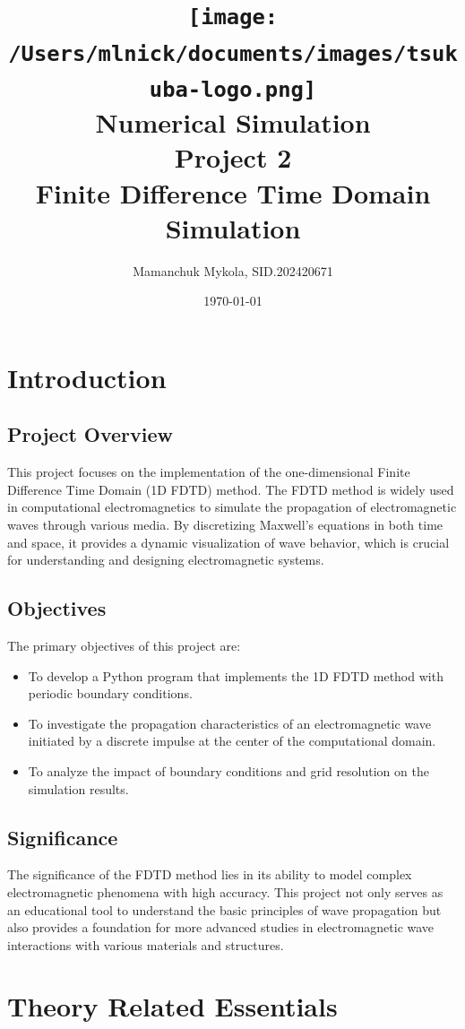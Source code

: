 \documentclass{article}[a4paper]
\title{
    \texttt{[image: /Users/mlnick/documents/images/tsukuba-logo.png]} \\
    \vspace{2mm}
    \textbf{Numerical Simulation} \\
    \vspace{3mm}    
    Project 2 \\
    Finite Difference Time Domain Simulation
}
\author{Mamanchuk Mykola, SID.202420671}
\date{\today}
\begin{document}
\maketitle

\section{Introduction}

\subsection{Project Overview}
This project focuses on the implementation of the one-dimensional Finite Difference Time Domain (1D FDTD) method. The FDTD method is widely used in computational electromagnetics to simulate the propagation of electromagnetic waves through various media. By discretizing Maxwell's equations in both time and space, it provides a dynamic visualization of wave behavior, which is crucial for understanding and designing electromagnetic systems.

\subsection{Objectives}
The primary objectives of this project are:
\begin{itemize}
    \item To develop a Python program that implements the 1D FDTD method with periodic boundary conditions.
    \item To investigate the propagation characteristics of an electromagnetic wave initiated by a discrete impulse at the center of the computational domain.
    \item To analyze the impact of boundary conditions and grid resolution on the simulation results.
\end{itemize}

\subsection{Significance}
The significance of the FDTD method lies in its ability to model complex electromagnetic phenomena with high accuracy. This project not only serves as an educational tool to understand the basic principles of wave propagation but also provides a foundation for more advanced studies in electromagnetic wave interactions with various materials and structures.

\section{Theory Related Essentials}
\end{document}
